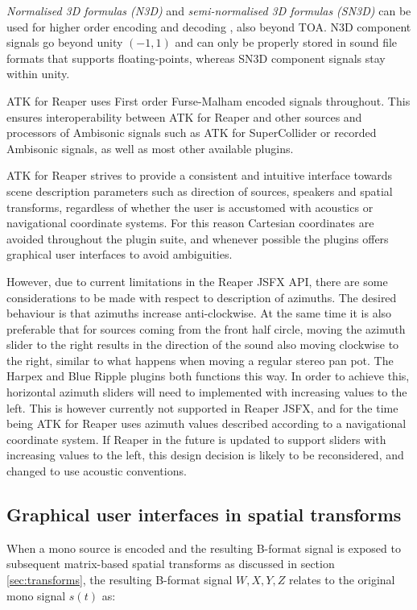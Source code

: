 \documentclass{article}
\begin{document}
\emph{Normalised 3D formulas (N3D)} and \emph{semi-normalised 3D formulas (SN3D)} can be used for higher order encoding and decoding  \cite{daniel:2001phd}, also beyond TOA.
N3D component signals go beyond unity $(-1, 1)$ and can only be properly stored in sound file formats that supports floating-points, whereas SN3D component signals stay within unity. 

ATK for Reaper uses First order Furse-Malham encoded signals throughout.
This ensures interoperability between ATK for Reaper and other sources and processors of Ambisonic signals such as ATK for SuperCollider or recorded Ambisonic signals, as well as most other available plugins.

ATK for Reaper strives to provide a consistent and intuitive interface towards scene description parameters such as direction of sources, speakers and spatial transforms, regardless of whether the user is accustomed with acoustics or navigational coordinate systems.
For this reason Cartesian coordinates are avoided throughout the plugin suite, and whenever possible the plugins offers graphical user interfaces to avoid ambiguities.

However, due to current limitations in the Reaper JSFX API, there are some considerations to be made with respect to description of azimuths.
The desired behaviour is that azimuths increase anti-clockwise.
At the same time it is also preferable that for sources coming from the front half circle, moving the azimuth slider to the right results in the direction of the sound also moving clockwise to the right, similar to what happens when moving a regular stereo pan pot.
The Harpex and Blue Ripple plugins both functions this way.
In order to achieve this, horizontal azimuth sliders will need to implemented with increasing values to the left.
This is however currently not supported in Reaper JSFX, and for the time being ATK for Reaper uses azimuth values described according to a navigational coordinate system.
If Reaper in the future is updated to support sliders with increasing values to the left, this design decision is likely to be reconsidered, and changed to use acoustic conventions.




\subsection{Graphical user interfaces in spatial transforms}\label{sec:gui}

When a mono source is encoded and the resulting B-format signal is exposed to subsequent matrix-based spatial transforms as discussed in section \ref{sec:transforms}, the resulting B-format signal $W, X, Y, Z$ relates to the original mono signal $s(t)$ as:
\end{document}
